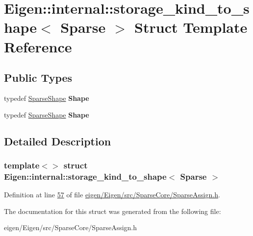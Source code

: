\hypertarget{struct_eigen_1_1internal_1_1storage__kind__to__shape_3_01_sparse_01_4}{}\section{Eigen\+:\+:internal\+:\+:storage\+\_\+kind\+\_\+to\+\_\+shape$<$ Sparse $>$ Struct Template Reference}
\label{struct_eigen_1_1internal_1_1storage__kind__to__shape_3_01_sparse_01_4}
\subsection*{Public Types}
\begin{DoxyCompactItemize}
\item 
\mbox{\label{struct_eigen_1_1internal_1_1storage__kind__to__shape_3_01_sparse_01_4_a689e0c288d635039f22652abf8de498f}} 
typedef \hyperlink{struct_eigen_1_1_sparse_shape}{Sparse\+Shape} {\bfseries Shape}
\item 
\mbox{\label{struct_eigen_1_1internal_1_1storage__kind__to__shape_3_01_sparse_01_4_a689e0c288d635039f22652abf8de498f}} 
typedef \hyperlink{struct_eigen_1_1_sparse_shape}{Sparse\+Shape} {\bfseries Shape}
\end{DoxyCompactItemize}


\subsection{Detailed Description}
\subsubsection*{template$<$$>$\newline
struct Eigen\+::internal\+::storage\+\_\+kind\+\_\+to\+\_\+shape$<$ Sparse $>$}



Definition at line \hyperlink{eigen_2_eigen_2src_2_sparse_core_2_sparse_assign_8h_source_l00057}{57} of file \hyperlink{eigen_2_eigen_2src_2_sparse_core_2_sparse_assign_8h_source}{eigen/\+Eigen/src/\+Sparse\+Core/\+Sparse\+Assign.\+h}.



The documentation for this struct was generated from the following file\+:\begin{DoxyCompactItemize}
\item 
eigen/\+Eigen/src/\+Sparse\+Core/\+Sparse\+Assign.\+h\end{DoxyCompactItemize}
